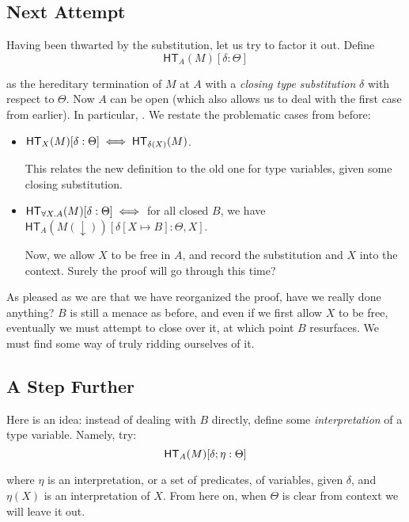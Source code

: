 \documentclass{article}
\begin{document}
\subsection{Next Attempt}

\newcommand{\htermFFm}[4]{\ensuremath{\mathsf{HT}_{#1}(#2)[#3 : #4]}}

Having been thwarted by the substitution, let us try to factor it out. Define
\[ \htermFFm{A}{M}{\delta}{\Theta} \]

as the hereditary termination of $M$ at $A$ with a \emph{closing type substitution} $\delta$ with respect
to $\Theta$. Now $A$ can be open (which also allows us to deal with the first case from earlier).
In particular, . We restate the problematic cases from before:

\begin{itemize}
    \item $\htermFFm{X}{M}{\delta}{\Theta} \iff \hterm{\delta(X)}{M}$.

    This relates the new definition to the old one for type variables, given some closing substitution.

    \item $\htermFFm{\all{X}{A}}{M}{\delta}{\Theta} \iff $ for all closed $B$, we have
          $\htermFFm{A}{M(\downarrow)}{\delta[X \mapsto B]}{\Theta, X}$.

    Now, we allow $X$ to be free in $A$, and record the substitution and $X$ into the context.
    Surely the proof will go through this time?
\end{itemize}

As pleased as we are that we have reorganized the proof, have we really done anything? $B$ is still
a menace as before, and even if we first allow $X$ to be free, eventually we must attempt to close
over it, at which point $B$ resurfaces. We must find some way of truly ridding ourselves of it.

\subsection{A Step Further}

Here is an idea: instead of dealing with $B$ directly, define some \emph{interpretation} of a type
variable. Namely, try:
\[ \mathsf{HT}_{A}(M)[\delta;\eta : \Theta] \]

where $\eta$ is an interpretation, or a set of predicates, of variables, given $\delta$, and
$\eta(X)$ is an interpretation of $X$.
From here on, when $\Theta$ is clear from context we will leave it out.
\end{document}
